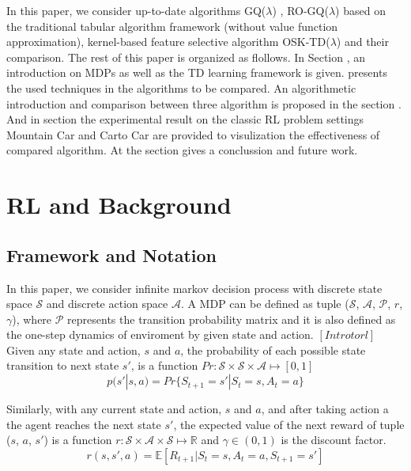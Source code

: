 \documentclass[conference]{IEEEtran}
\begin{document}
In this paper, we consider up-to-date algorithms GQ($\lambda$) \cite{maei2010gq}, RO-GQ($\lambda$) \cite{liu2012regularized} based on the traditional tabular algorithm framework (without value function approximation), kernel-based feature selective algorithm OSK-TD($\lambda$) \cite{chen2013online} and their comparison. The rest of this paper is organized as flollows. In Section \uppercase\expandafter{}, an introduction on MDPs as well as the TD learning framework is given. \uppercase\expandafter{} presents the used techniques in the algorithms to be compared. An algorithmetic introduction and comparison between three algorithm is proposed in the section \uppercase\expandafter{}. And in section \uppercase\expandafter{} the experimental result on the classic RL problem settings Mountain Car and Carto Car are provided to visulization the effectiveness of compared algorithm. At the \uppercase\expandafter{} section gives a conclussion and future work.\\

\section{RL and Background}
\subsection{Framework and Notation}
In this paper, we consider infinite markov decision process with discrete state space $\mathcal{S}$ and discrete action space $\mathcal{A}$. A  MDP can be defined as tuple ($\mathcal{S}$, $\mathcal{A}$, $\mathcal{P}$, $r$, $\gamma$), where $\mathcal{P}$ represents the transition probability matrix and it is also defined as the one-step dynamics of enviroment by given state and action. $[Intro to rl]$ Given any state and action, $s$ and $a$, the probability of each possible state transition to next state $s'$, is a function $Pr:\mathcal{S}\times\mathcal{S}\times\mathcal{A}\mapsto[0, 1]$
\begin{equation}
  p(s'|s, a)=Pr\{S_{t+1}=s'|S_t=s,A_t=a\}
\end{equation}


Similarly, with any current state and action, $s$ and $a$, and after taking action a the agent reaches the next state $s'$, the expected value of the next reward of tuple ($s$, $a$, $s'$) is a function $r:\mathcal{S}\times\mathcal{A}\times\mathcal{S}\mapsto\mathbb{R}$ and $\gamma\in(0, 1)$ is the discount factor.
\begin{equation}
  r(s, s', a)=\mathbb{E}[R_{t+1}|S_t=s,A_t=a, S_{t+1}=s']
\end{equation}
\end{document}
